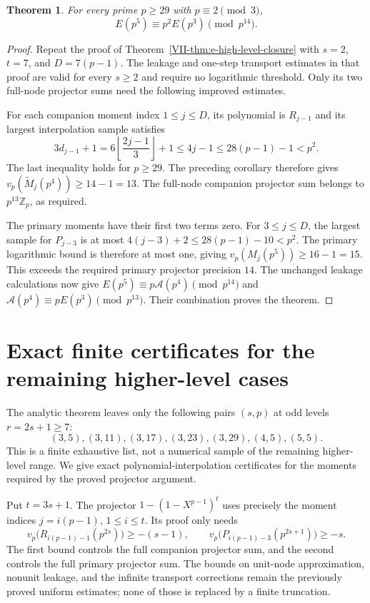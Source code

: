 \documentclass[11pt,letterpaper]{article}
\newtheorem{theorem}{Theorem}[section]
\numberwithin{equation}{section}
\begin{document}
\begin{theorem}\label{VII-thm:e-level-five-large-primes}
For every prime $p\ge29$ with $p\equiv2\pmod3$,
\[
 \boxed{E(p^5)\equiv p^2E(p^3)\pmod{p^{14}}.}
\]
\end{theorem}
\begin{proof}
Repeat the proof of Theorem~\ref{VII-thm:e-high-level-closure} with
$s=2$, $t=7$, and $D=7(p-1)$. The leakage and one-step transport
estimates in that proof are valid for every $s\ge2$ and require
no logarithmic threshold. Only its two full-node projector sums
need the following improved estimates.

For each companion moment index $1\le j\le D$, its polynomial
is $R_{j-1}$ and its largest interpolation sample satisfies
\[
 3d_{j-1}+1
 =6\left\lfloor\frac{2j-1}{3}\right\rfloor+1
 \le4j-1\le28(p-1)-1<p^2.
\]
The last inequality holds for $p\ge29$. The preceding corollary
therefore gives
$v_p(\widetilde M_j(p^4))\ge14-1=13$.
The full-node companion projector sum belongs to $p^{13}\mathbb Z_p$,
as required.

The primary moments have their first two terms zero. For $3\le j\le D$,
the largest sample for $P_{j-3}$ is at most
$4(j-3)+2\le28(p-1)-10<p^2$.
The primary logarithmic bound is therefore at most one, giving
$v_p(M_j(p^5))\ge16-1=15$. This exceeds the required primary
projector precision $14$. The unchanged leakage calculations now
give $E(p^5)\equiv p\mathcal A(p^4)\pmod{p^{14}}$ and
$\mathcal A(p^4)\equiv pE(p^3)\pmod{p^{13}}$.
Their combination proves the theorem.
\end{proof}

\section{Exact finite certificates for the remaining higher-level cases}\label{loc-VII-12}
\label{VII-sec:E7finiteexceptions}
The analytic theorem leaves only the following pairs $(s,p)$ at
odd levels $r=2s+1\ge7$:
\[
 (3,5),(3,11),(3,17),(3,23),(3,29),(4,5),(5,5).
\]
This is a finite exhaustive list, not a numerical sample of the
remaining higher-level range. We give exact polynomial-interpolation
certificates for the moments required by the proved projector argument.

Put $t=3s+1$. The projector $1-(1-X^{p-1})^t$ uses precisely the
moment indices $j=i(p-1)$, $1\le i\le t$. Its proof only needs
\begin{equation}\label{VII-E7:finite-required}
 v_p\bigl(R_{i(p-1)-1}(p^{2s})\bigr)\ge-(s-1),\qquad
 v_p\bigl(P_{i(p-1)-3}(p^{2s+1})\bigr)\ge-s.
\end{equation}
The first bound controls the full companion projector sum, and the
second controls the full primary projector sum. The bounds on unit-node
approximation, nonunit leakage, and the infinite transport corrections
remain the previously proved uniform estimates; none of those is
replaced by a finite truncation.
\end{document}
